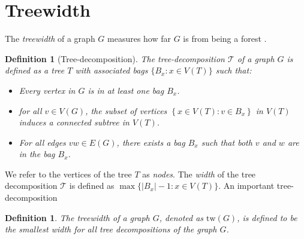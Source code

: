 \documentclass[]{report}
\newcommand{\tree}{\mathcal{T}}
\newcommand{\tw}{\text{tw}}
\newtheorem{definition}[theorem]{Definition}
\theoremstyle{definition}
\numberwithin{theorem}{section}
\numberwithin{equation}{section}
\begin{document}
\section{Treewidth}\label{sec:treewidth}

The \textit{treewidth} of a graph $G$ measures how far $G$ is from being a forest \cite{diestelGraphMinors2017}. 

\begin{definition}[Tree-decomposition]\label{def:tree-decomposition}
	The tree-decomposition $\tree$ of a graph $G$ is defined as a tree $T$ with associated \textit{bags} $\lbrace B_x : x \in V(T) \rbrace$ such that:
	\begin{itemize}
		\item Every vertex in $G$ is in at least one bag $B_x$. 
		\item for all $v \in V(G)$, the subset of vertices $\left\lbrace x \in V(T): v \in B_x \right\rbrace$ in $V(T)$ induces a connected subtree in $V(T)$.
		\item For all edges $vw \in E(G)$, there exists a bag $B_x$ such that both $v$ and $w$ are in the bag $B_x$.
	\end{itemize}
\end{definition}
We refer to the vertices of the tree $T$ as \textit{nodes}. 
The \textit{width} of the tree decomposition $\tree$ is defined as $\max \lbrace |B_x| - 1 : x \in V(T) \rbrace$. An important tree-decomposition 

\begin{definition}\label{def:treewidth}
	The treewidth of a graph $G$, denoted as $\tw(G)$, is defined to be the smallest width for all tree decompositions of the graph $G$.
\end{definition}
\end{document}
